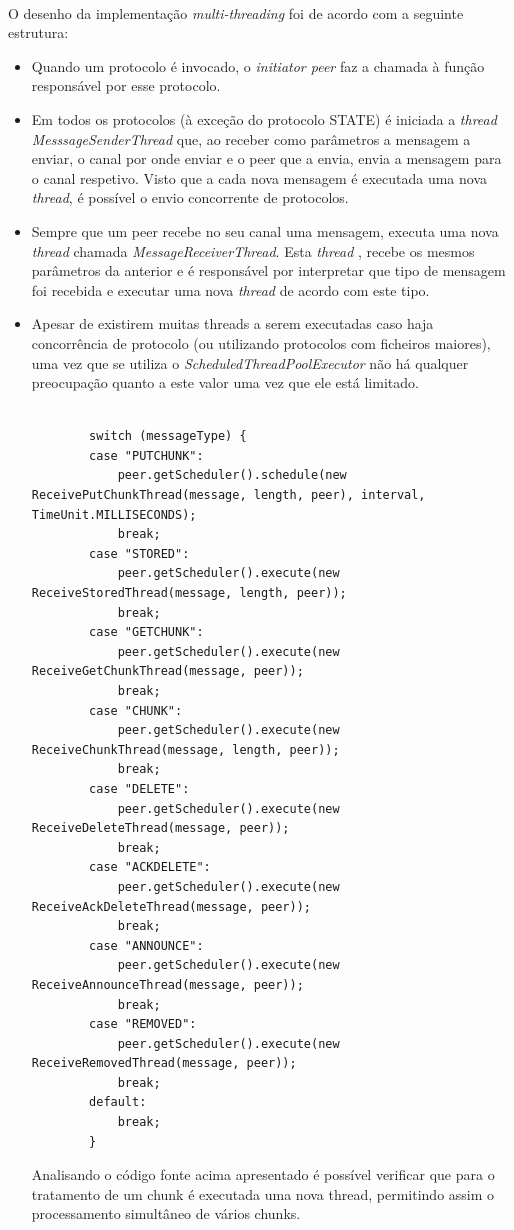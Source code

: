 \documentclass[11pt,oneside]{book}
\begin{document}
\paragraph{}
    O desenho da implementação \textit{multi-threading} foi de acordo com a 
    seguinte estrutura:
    \begin{itemize}
        
        \item Quando um protocolo é invocado, o \textit{initiator peer} faz a
        chamada à função responsável por esse protocolo. 
        \item Em todos os protocolos (à exceção do protocolo STATE) é iniciada a 
        \textit{thread MesssageSenderThread} que, ao receber como parâmetros a
        mensagem a enviar, o canal por onde enviar e o peer que a envia, envia a
        mensagem para o canal respetivo. Visto que a cada nova mensagem é executada
        uma nova \textit{thread}, é possível o envio concorrente de protocolos.  
        \item Sempre que um peer recebe no seu canal uma mensagem, executa uma nova
        \textit{thread} chamada \textit{MessageReceiverThread}. Esta \textit{thread}
        , recebe os mesmos parâmetros da anterior e é responsável por interpretar 
        que tipo de mensagem foi recebida e executar uma nova \textit{thread} de acordo
        com este tipo. 
        \item Apesar de existirem muitas threads a serem executadas caso haja concorrência de
        protocolo (ou utilizando protocolos com ficheiros maiores), uma vez que se utiliza o 
        \textit{ScheduledThreadPoolExecutor} não há qualquer preocupação quanto a este valor
        uma vez que ele está limitado.
        
        \pagebreak

        \begin{lstlisting}

		switch (messageType) {
		case "PUTCHUNK":
			peer.getScheduler().schedule(new ReceivePutChunkThread(message, length, peer), interval, TimeUnit.MILLISECONDS);
			break;
		case "STORED":
			peer.getScheduler().execute(new ReceiveStoredThread(message, length, peer));
			break;
		case "GETCHUNK":
			peer.getScheduler().execute(new ReceiveGetChunkThread(message, peer));
			break;
		case "CHUNK":
			peer.getScheduler().execute(new ReceiveChunkThread(message, length, peer));
			break;
		case "DELETE":
			peer.getScheduler().execute(new ReceiveDeleteThread(message, peer));
			break;
		case "ACKDELETE":
			peer.getScheduler().execute(new ReceiveAckDeleteThread(message, peer));
			break;
		case "ANNOUNCE":
			peer.getScheduler().execute(new ReceiveAnnounceThread(message, peer));
			break;
		case "REMOVED":
			peer.getScheduler().execute(new ReceiveRemovedThread(message, peer));
			break;
		default:
			break;
		}
        \end{lstlisting}
        
        Analisando o código fonte acima apresentado é possível verificar que para 
        o tratamento de um chunk é executada uma nova thread, permitindo assim o
        processamento simultâneo de vários chunks.  
        
        
    \end{itemize}
\end{document}
